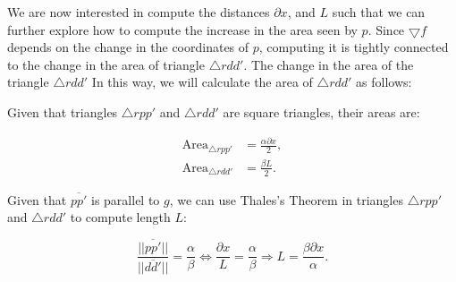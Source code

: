 

We are now interested in compute the distances $\partial x$, and $L$ such that we can further explore how to compute the increase in the area seen by $p$. Since $\bigtriangledown f$ depends on the change in the coordinates of $p$, computing it is tightly connected to the change in the area of triangle $\triangle rdd'$. The change in the area of the triangle $\triangle rdd'$  In this way, we will calculate the area of $\triangle rdd'$ as follows:

Given that triangles $\triangle rpp'$ and $\triangle rdd'$ are square triangles, their areas are:

\begin{align}
    \text{Area}_{\triangle rpp'} &= \frac{\alpha \partial x}{2}, \label{eq:rpp}\\
    \text{Area}_{\triangle rdd'} &= \frac{\beta L}{2}. \label{eq:rdd}   
\end{align}


Given that $\overline{pp'}$ is parallel to $g$, we can use Thales's Theorem in triangles $\triangle rpp'$ and $\triangle rdd'$ to compute length $L$: 

\begin{equation}
    \frac{||\overline{pp'}||}{||\overline{dd'}||} = \frac \alpha \beta \iff \frac{\partial x}{L} = \frac \alpha \beta \Rightarrow L = \frac{\beta \partial x}{\alpha}.
    \label{eq:L}
\end{equation}



